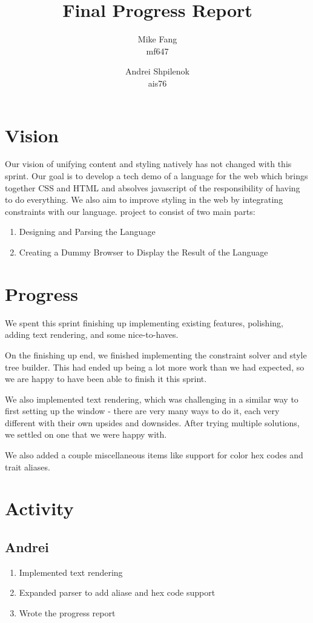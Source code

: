 \documentclass{article}
\title{Final Progress Report}
\author{Mike Fang\\ mf647 \and Andrei Shpilenok\\ ais76}
\begin{document}
\maketitle
\section*{Vision}
Our vision of unifying content and styling natively has not
changed with this sprint. Our goal is to develop a tech demo of a language
for the web which brings together CSS and HTML and absolves
javascript of the responsibility of having to do everything. We also aim to improve 
styling in the web by integrating constraints with our language.
project to consist of two main parts:
\begin{enumerate}
	\item Designing and Parsing the Language
	\item Creating a Dummy Browser to Display the Result of the Language
\end{enumerate}

\section*{Progress}

We spent this sprint finishing up implementing existing features, polishing, adding text rendering, and some nice-to-haves.

On the finishing up end, we finished implementing the constraint solver and style tree builder. This
had ended up being a lot more work than we had expected, so we are happy to have been able to finish
it this sprint. 

We also implemented text rendering, which was challenging in a similar way to first setting up the
window - there are very many ways to do it, each very different with their own upsides and downsides.
After trying multiple solutions, we settled on one that we were happy with.

We also added a couple miscellaneous items like support for color hex codes and trait aliases.

\section*{Activity}

\subsection*{Andrei}
\begin{enumerate}
	\item Implemented text rendering
	\item Expanded parser to add aliase and hex code support
    \item Wrote the progress report
\end{enumerate}
\end{document}
